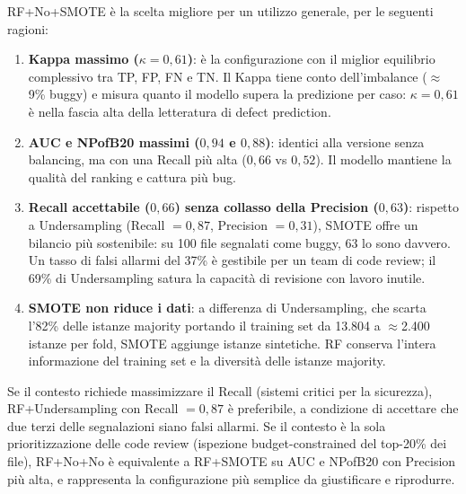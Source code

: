RF+No+SMOTE è la scelta migliore per un utilizzo generale, per le seguenti ragioni:

\begin{enumerate}
\item \textbf{Kappa massimo ($\kappa = 0{,}61$)}: è la configurazione con il miglior
      equilibrio complessivo tra TP, FP, FN e TN. Il Kappa tiene conto dell'imbalance
      ($\approx$9\% buggy) e misura quanto il modello supera la predizione per caso:
      $\kappa = 0{,}61$ è nella fascia alta della letteratura di defect prediction.

\item \textbf{AUC e NPofB20 massimi ($0{,}94$ e $0{,}88$)}: identici alla versione
      senza balancing, ma con una Recall più alta ($0{,}66$ vs $0{,}52$). Il modello
      mantiene la qualità del ranking e cattura più bug.

\item \textbf{Recall accettabile ($0{,}66$) senza collasso della Precision ($0{,}63$)}:
      rispetto a Undersampling (Recall $= 0{,}87$, Precision $= 0{,}31$), SMOTE offre
      un bilancio più sostenibile: su 100 file segnalati come buggy, 63 lo sono davvero.
      Un tasso di falsi allarmi del 37\% è gestibile per un team di code review;
      il 69\% di Undersampling satura la capacità di revisione con lavoro inutile.

\item \textbf{SMOTE non riduce i dati}: a differenza di Undersampling, che scarta
      l'82\% delle istanze majority portando il training set da 13.804 a $\approx$2.400
      istanze per fold, SMOTE aggiunge istanze sintetiche. RF conserva l'intera
      informazione del training set e la diversità delle istanze majority.
\end{enumerate}

Se il contesto richiede massimizzare il Recall (sistemi critici per la sicurezza),
RF+Undersampling con Recall $= 0{,}87$ è preferibile, a condizione di accettare che
due terzi delle segnalazioni siano falsi allarmi. Se il contesto è la sola
prioritizzazione delle code review (ispezione budget-constrained del top-20\% dei file),
RF+No+No è equivalente a RF+SMOTE su AUC e NPofB20 con Precision più alta, e rappresenta
la configurazione più semplice da giustificare e riprodurre.
